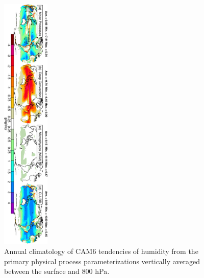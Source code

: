 
\clearpage
\begin{figure}[t]
  \begin{center}
    \includegraphics[width=0.2\textwidth,angle=90.]{./figs/f_DQDT_PBL_2D_CAM6_ANN.pdf}
  \end{center}
  \caption{Annual climatology of CAM6 tendencies of humidity from the primary physical process parameterizations vertically averaged between the surface and 800 hPa.} 
\label{f_DQDT_PBL_2D_CAM6_ANN}
\end{figure} 

